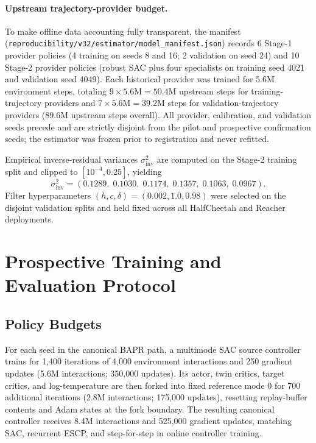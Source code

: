 \paragraph{Upstream trajectory-provider budget.}
To make offline data accounting fully transparent, the manifest (\texttt{reproducibility/v32/estimator/model\_manifest.json}) records 6 Stage-1 provider policies (4 training on seeds 8 and 16; 2 validation on seed 24) and 10 Stage-2 provider policies (robust SAC plus four specialists on training seed 4021 and validation seed 4049). Each historical provider was trained for 5.6M environment steps, totaling $9\times 5.6\text{M}=50.4\text{M}$ upstream steps for training-trajectory providers and $7\times 5.6\text{M}=39.2\text{M}$ steps for validation-trajectory providers ($89.6\text{M}$ upstream steps overall). All provider, calibration, and validation seeds precede and are strictly disjoint from the pilot and prospective confirmation seeds; the estimator was frozen prior to registration and never refitted.

Empirical inverse-residual variances $\sigma_{\mathrm{inv}}^2$ are computed on the Stage-2 training split and clipped to $[10^{-4},0.25]$, yielding
\begin{equation}
 \sigma_{\mathrm{inv}}^2 = (0.1289,\;0.1030,\;0.1174,\;0.1357,\;0.1063,\;0.0967).
\end{equation}
Filter hyperparameters $(h,c,\delta)=(0.002,1.0,0.98)$ were selected on the disjoint validation splits and held fixed across all HalfCheetah and Reacher deployments.

\section{Prospective Training and Evaluation Protocol}
\label{app:protocol}

\subsection{Policy Budgets}

For each seed in the canonical BAPR path, a multimode SAC source controller trains for 1,400 iterations of 4,000 environment interactions and 250 gradient updates (5.6M interactions; 350,000 updates). Its actor, twin critics, target critics, and log-temperature are then forked into fixed reference mode 0 for 700 additional iterations (2.8M interactions; 175,000 updates), resetting replay-buffer contents and Adam states at the fork boundary. The resulting canonical controller receives 8.4M interactions and 525,000 gradient updates, matching SAC, recurrent ESCP, and \resacbaseline{} step-for-step in online controller training.


